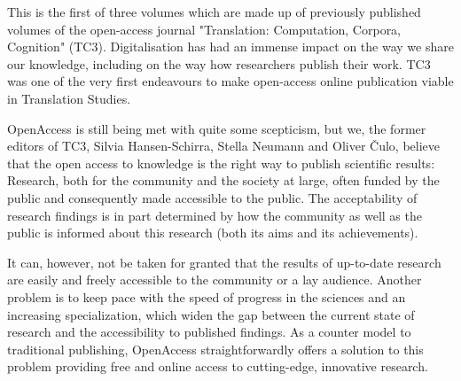 



This is the first of three volumes which are made up of previously published volumes of the open-access journal "Translation: Computation, Corpora, Cognition" (TC3). Digitalisation has had an immense impact on the way we share our knowledge, including on the way how researchers publish their work. TC3 was one of the very first endeavours to make open-access online publication viable in Translation Studies. 

OpenAccess is still being met with quite some scepticism, but we, the former editors of TC3, Silvia Hansen-Schirra, Stella Neumann and Oliver Čulo, believe that the open access to knowledge is the right way to publish scientific results: Research, both for the community and the society at large, often funded by the public and consequently made accessible to the public. The acceptability of research findings is in part determined by how the community as well as the public is informed about this research (both its aims and its achievements). 

It can, however, not be taken for granted that the results of up-to-date research are easily and freely accessible to the community or a lay audience. Another problem is to keep pace with the speed of progress in the sciences and an increasing specialization, which widen the gap between the current state of research and the accessibility to published findings. As a counter model to traditional publishing, OpenAccess straightforwardly offers a solution to this problem providing free and online access to cutting-edge, innovative research.


